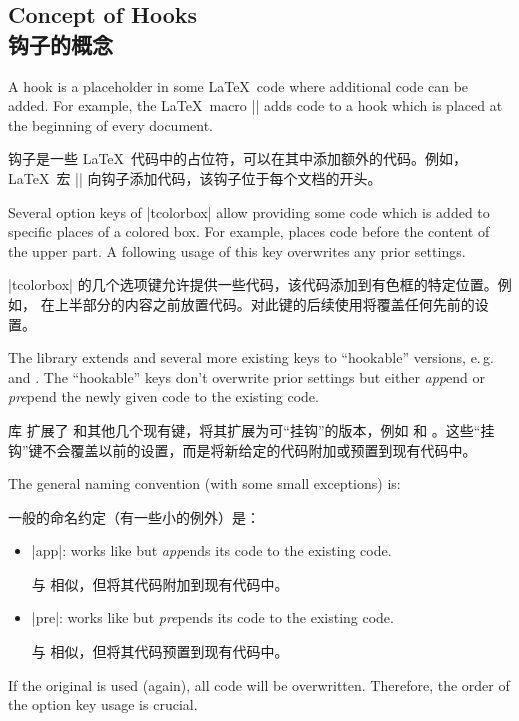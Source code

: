 
\subsection{Concept of Hooks\\钩子的概念}
A hook is a placeholder in some \LaTeX\ code where additional code
can be added. For example, the \LaTeX\ macro |\AtBeginDocument| adds code to a
hook which is placed at the beginning of every document.

钩子是一些 \LaTeX\ 代码中的占位符，可以在其中添加额外的代码。例如，\LaTeX\ 宏 |\AtBeginDocument| 向钩子添加代码，该钩子位于每个文档的开头。

Several option keys of |tcolorbox| allow providing some code which is
added to specific places of a colored box. For example, 
places code before the content of the upper part. A following usage of this
key overwrites any prior settings.

|tcolorbox| 的几个选项键允许提供一些代码，该代码添加到有色框的特定位置。例如， 在上半部分的内容之前放置代码。对此键的后续使用将覆盖任何先前的设置。

The library  extends  and several more
existing keys to \enquote{hookable} versions, e.\,g.\ 
 and .
The \enquote{hookable} keys don't overwrite prior settings but either \emph{app}end
or \emph{pre}pend the newly given code to the existing code.

库  扩展了  和其他几个现有键，将其扩展为可“挂钩”的版本，例如  和 。这些“挂钩”键不会覆盖以前的设置，而是将新给定的代码附加或预置到现有代码中。

The general naming convention (with some small exceptions) is:

一般的命名约定（有一些小的例外）是：
\begin{itemize}
\item {} |app|: works like  but
  \emph{app}ends its code to the existing code.

  与  相似，但将其代码附加到现有代码中。
\item {} |pre|: works like \meta{option key} but
  \emph{pre}pends its code to the existing code.

  与  相似，但将其代码预置到现有代码中。
\end{itemize}
If the original  is used (again), all code will be overwritten.
Therefore, the order of the option key usage is crucial.

